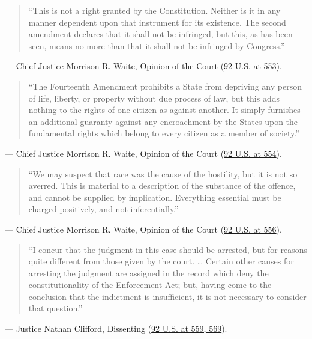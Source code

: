 \documentclass[12pt]{article}
\begin{document}
\begin{quote}
``This is not a right granted by the Constitution. Neither is it in any manner dependent upon that instrument for its existence. The second amendment declares that it shall not be infringed, but this, as has been seen, means no more than that it shall not be infringed by Congress.''
\end{quote}
\noindent --- Chief Justice Morrison R. Waite, Opinion of the Court (\href{https://supreme.justia.com/cases/federal/us/92/542/}{92 U.S. at 553}).

\begin{quote}
``The Fourteenth Amendment prohibits a State from depriving any person of life, liberty, or property without due process of law, but this adds nothing to the rights of one citizen as against another. It simply furnishes an additional guaranty against any encroachment by the States upon the fundamental rights which belong to every citizen as a member of society.''
\end{quote}
\noindent --- Chief Justice Morrison R. Waite, Opinion of the Court (\href{https://supreme.justia.com/cases/federal/us/92/542/}{92 U.S. at 554}).

\begin{quote}
``We may suspect that race was the cause of the hostility, but it is not so averred. This is material to a description of the substance of the offence, and cannot be supplied by implication. Everything essential must be charged positively, and not inferentially.''
\end{quote}
\noindent --- Chief Justice Morrison R. Waite, Opinion of the Court (\href{https://supreme.justia.com/cases/federal/us/92/542/}{92 U.S. at 556}).

\begin{quote}
``I concur that the judgment in this case should be arrested, but for reasons quite different from those given by the court. \dots{} Certain other causes for arresting the judgment are assigned in the record which deny the constitutionality of the Enforcement Act; but, having come to the conclusion that the indictment is insufficient, it is not necessary to consider that question.''
\end{quote}
\noindent --- Justice Nathan Clifford, Dissenting (\href{https://supreme.justia.com/cases/federal/us/92/542/}{92 U.S. at 559, 569}).
\end{document}
